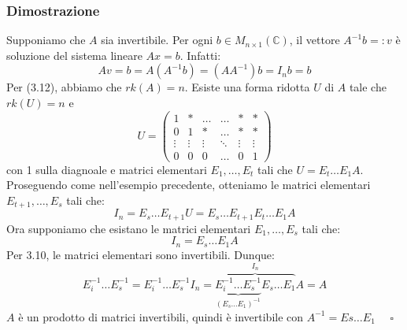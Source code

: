 \documentclass[a4paper]{article}
\theoremstyle{break}
\theoremstyle{break}
\theoremstyle{break}
\theoremstyle{break}
\begin{document}
\subsubsection{Dimostrazione}
Supponiamo che \( A \) sia invertibile. Per ogni \( b \in M_{n \times 1}(\mathbb{C}) \),
il vettore \( A^{-1}b =: v \) è soluzione del sistema lineare \( Ax = b \). Infatti:
\[
  Av = b = A(A^{-1}b) = (AA^{-1})b = I_nb = b
\] 
Per (3.12), abbiamo che \( rk(A) = n \). Esiste una forma ridotta \( U \) di \( A \) tale
che \( rk(U) = n \) e
\[
  U = \begin{pmatrix} 
    1 & * & \ldots & \ldots & * & *\\
    0 & 1 & * & \ldots & * & *\\
    \vdots & \vdots & \vdots & \ddots & \vdots & \vdots\\
    0 & 0 & 0 & \ldots & 0 & 1
  \end{pmatrix} 
\] 
con 1 sulla diagnoale e matrici elementari \( E_1, \ldots, E_t \) tali che \( U = E_t
\ldots E_1A \). Proseguendo come nell'esempio precedente, otteniamo le matrici elementari
\( E_{t+1}, \ldots, E_s \) tali che:
\[ I_n = E_s \ldots E_{t+1}U = E_s \ldots E_{t+1}E_t
\ldots E_1A \]
Ora supponiamo che esistano le matrici elementari \( E_1, \ldots, E_s \) tali che:
\[
 I_n = E_s \ldots E_1A
\] 
Per 3.10, le matrici elementari sono invertibili. Dunque:
\[
  E_i^{-1} \ldots E_s^{-1} = E_i^{-1} \ldots E_s^{-1}I_n =
  \overbrace{\underbrace{E_i^{-1} \ldots E_s^{-1}}_{(E_s \ldots E_1)^{-1}}E_s \ldots E_1}^{I_n}
  A = A
\]
\( A \) è un prodotto di matrici invertibili, quindi è invertibile con \( A^{-1} = Es \ldots E_1 \) 
\( \quad \square \) 
\end{document}
